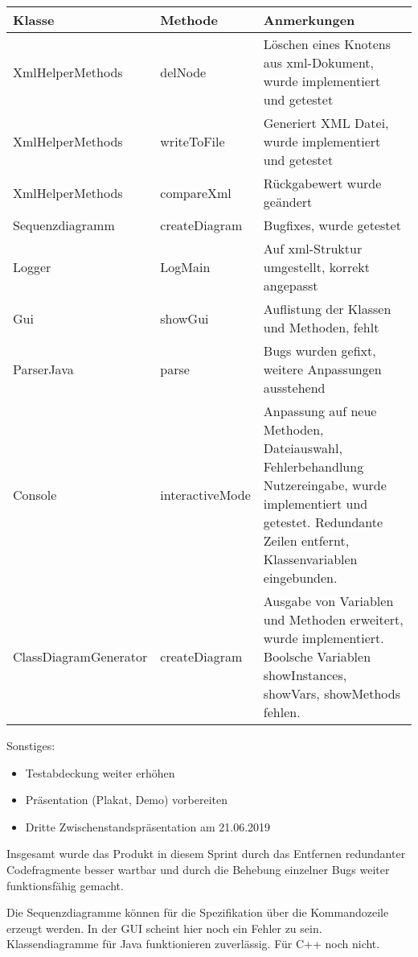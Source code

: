 \begin{table}[H]

\begin{tabularx}{\textwidth}{ |l|l|X| }
\hline
\textbf{Klasse} & \textbf{Methode} & \textbf{Anmerkungen}\\
 \hline
XmlHelperMethods & delNode & Löschen eines Knotens aus xml-Dokument, wurde implementiert und getestet\\ \hline
XmlHelperMethods & writeToFile & Generiert XML Datei, wurde implementiert und getestet\\ \hline
XmlHelperMethods & compareXml & Rückgabewert wurde geändert \\ \hline
Sequenzdiagramm & createDiagram & Bugfixes, wurde getestet\\\hline
Logger & LogMain & Auf xml-Struktur umgestellt, korrekt angepasst\\\hline
Gui & showGui & Auflistung der Klassen und Methoden, fehlt\\\hline
ParserJava & parse & Bugs wurden gefixt, weitere Anpassungen ausstehend \\ \hline
Console & interactiveMode & Anpassung auf neue Methoden, Dateiauswahl, Fehlerbehandlung Nutzereingabe, wurde implementiert und getestet. Redundante Zeilen entfernt, Klassenvariablen eingebunden. \\ \hline
ClassDiagramGenerator & createDiagram & Ausgabe von Variablen und Methoden erweitert, wurde implementiert. Boolsche Variablen showInstances, showVars, showMethods fehlen.\\ \hline
\end{tabularx}
\end{table}

Sonstiges:
\begin{itemize}
\item Testabdeckung weiter erhöhen
\item Präsentation (Plakat, Demo) vorbereiten
\item Dritte Zwischenstandspräsentation am 21.06.2019
\end{itemize}
\nsecend%

Insgesamt wurde das Produkt in diesem Sprint durch das Entfernen redundanter Codefragmente besser wartbar und durch die Behebung einzelner Bugs weiter funktionsfähig gemacht.
\nsecend%

Die Sequenzdiagramme können für die Spezifikation über die Kommandozeile erzeugt werden. In der GUI scheint hier noch ein Fehler zu sein. Klassendiagramme für Java funktionieren zuverlässig. Für C++ noch nicht. 
\nsecend%

